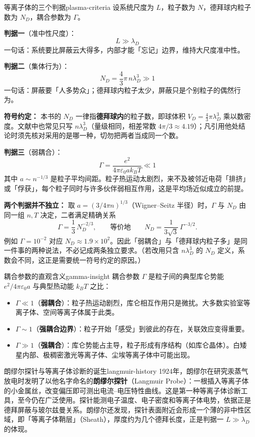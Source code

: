 \documentclass[12pt,a4paper,openany,oneside]{book}
\newcommand{\eps}{\varepsilon}
\begin{document}
\begin{theorem}{等离子体的三个判据}{plasma-criteria}
设系统尺度为 $L$，粒子数为 $N$，德拜球内粒子数为 $N_D$，耦合参数为 $\Gamma$。

\textbf{判据一}（准中性尺度）：
\[
L \gg \lambda_D
\]
一句话：系统要比屏蔽云大得多，内部才能「忘记」边界，维持大尺度准中性。

\textbf{判据二}（集体行为）：
\[
N_D = \frac{4}{3}\pi\, n\lambda_D^3 \gg 1
\]
一句话：屏蔽要「人多势众」；德拜球内粒子太少，屏蔽只是个别粒子的偶然行为。

\textbf{符号约定：} 本书的 $N_D$ 一律指\textbf{德拜球内}的粒子数，即球体积 $V_D=\frac43\pi\lambda_D^3$ 乘以数密度。文献中也常见只写 $n\lambda_D^3$（量级相同，相差常数 $4\pi/3\approx4.19$）；凡引用他处结论时须先核对采用的是哪一种，切勿把两者当成同一个数。

\textbf{判据三}（弱耦合）：
\[
\Gamma = \frac{e^2}{4\pi\eps_0 a k_B T} \ll 1
\]
其中 $a \sim n^{-1/3}$ 是粒子平均间距。粒子热运动太剧烈，来不及被邻近电荷「排挤」或「俘获」，每个粒子同时与许多伙伴弱相互作用，这是平均场近似成立的前提。

\textbf{两个判据并不独立：} 取 $a=(3/4\pi n)^{1/3}$（Wigner--Seitz 半径）时，$\Gamma$ 与 $N_D$ 由同一组 $n,T$ 决定，二者满足精确关系
\[
\Gamma = \frac{1}{3}\,N_D^{-2/3},
\qquad\text{等价地}\qquad
N_D = \frac{1}{3\sqrt{3}}\,\Gamma^{-3/2}.
\]
例如 $\Gamma=10^{-2}$ 对应 $N_D\approx 1.9\times10^{2}$。因此「弱耦合」与「德拜球内粒子多」是同一件事的两种说法，不必记成两条独立要求。（若改用只含 $n\lambda_D^3$ 的 $N_D$ 定义，系数会不同，这正是需要统一符号约定的原因。）
\end{theorem}

\begin{insight}{耦合参数的直观含义}{gamma-insight}
耦合参数 $\Gamma$ 是粒子间的典型库仑势能 $e^2/4\pi\eps_0 a$ 与典型热动能 $k_BT$ 之比：
\begin{itemize}
\item $\Gamma \ll 1$（\textbf{弱耦合}）：粒子热运动剧烈，库仑相互作用只是微扰。大多数实验室等离子体、空间等离子体属于此类。
\item $\Gamma \sim 1$（\textbf{强耦合边界}）：粒子开始「感受」到彼此的存在，关联效应变得重要。
\item $\Gamma \gg 1$（\textbf{强耦合}）：库仑势能占主导，粒子形成有序结构（如库仑晶体）。白矮星内部、极稠密激光等离子体、尘埃等离子体中可能出现。
\end{itemize}
\end{insight}

\begin{history}{朗缪尔探针与等离子体诊断的诞生}{langmuir-history}
1924年，朗缪尔在研究汞蒸气放电时发明了以他名字命名的\textbf{朗缪尔探针}（Langmuir Probe）：一根插入等离子体的小金属丝，改变偏压即可测出电流--电压特性曲线。这是第一种等离子体诊断工具，至今仍在广泛使用。探针能测电子温度、电子密度和等离子体电势，依据正是德拜屏蔽与玻尔兹曼关系。朗缪尔还发现，探针表面附近会形成一个薄的非中性区域，即「等离子体鞘层」（Sheath），厚度约为几个德拜长度，正是判据一 $L \gg \lambda_D$ 的体现。
\end{history}
\end{document}

